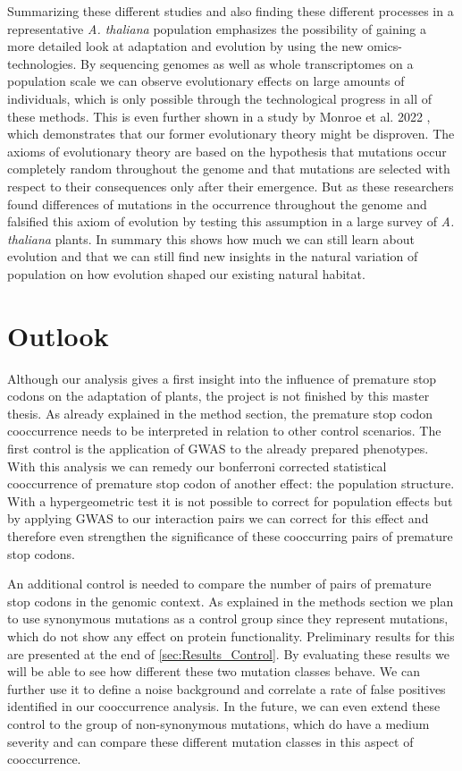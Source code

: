 Summarizing these different studies and also finding these different processes in a representative \textit{A. thaliana} population emphasizes the possibility of gaining a more detailed look at adaptation and evolution by using the new \grqq omics\grqq{}-technologies. By sequencing genomes as well as whole transcriptomes on a population scale we can observe evolutionary effects on large amounts of individuals, which is only possible through the technological progress in all of these methods. This is even further shown in a study by Monroe et al. 2022 \cite{Monroe2022}, which demonstrates that our former evolutionary theory might be disproven. The axioms of evolutionary theory are based on the hypothesis that mutations occur completely random throughout the genome and that mutations are selected with respect to their consequences only after their emergence. But as these researchers found differences of mutations in the occurrence throughout the genome and falsified this axiom of evolution by testing this assumption in a large survey of \textit{A. thaliana} plants. In summary this shows how much we can still learn about evolution and that we can still find new insights in the natural variation of population on how evolution shaped our existing natural habitat.


\chapter{Outlook}
Although our analysis gives a first insight into the influence of premature stop codons on the adaptation of plants, the project is not finished by this master thesis. As already explained in the method section, the premature stop codon cooccurrence needs to be interpreted in relation to other control scenarios. The first control is the application of GWAS to the already prepared phenotypes. With this analysis we can remedy our bonferroni corrected statistical cooccurrence of premature stop codon of another effect: the population structure. With a hypergeometric test it is not possible to correct for population effects but by applying GWAS to our interaction pairs we can correct for this effect and therefore even strengthen the significance of these cooccurring pairs of premature stop codons. 

An additional control is needed to compare the number of pairs of premature stop codons in the genomic context. As explained in the methods section we plan to use synonymous mutations as a control group since they represent mutations, which do not show any effect on protein functionality. Preliminary results for this are presented at the end of \autoref{sec:Results_Control}. By evaluating these results we will be able to see how different these two mutation classes behave. We can further use it to define a noise background and correlate a rate of false positives identified in our cooccurrence analysis. In the future, we can even extend these control to the group of non-synonymous mutations, which do have a medium severity and can compare these different mutation classes in this aspect of cooccurrence. 

